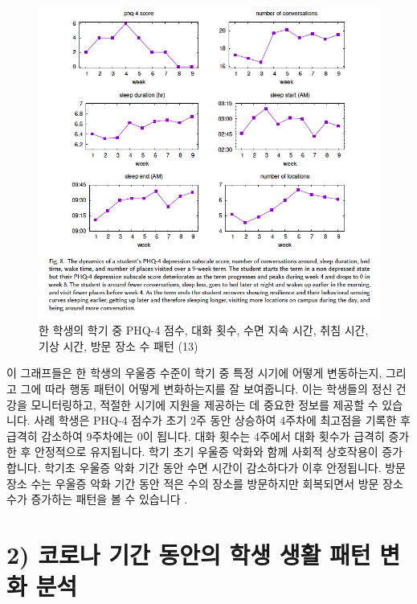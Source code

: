 \documentclass[
  letterpaper,
]{book}
\begin{document}
\begin{figure}[H]

{\centering \includegraphics{img/fig9.png}

}

\caption{한 학생의 학기 중 PHQ-4 점수, 대화 횟수, 수면 지속 시간, 취침
시간, 기상 시간, 방문 장소 수 패턴 (13)}

\end{figure}%

이 그래프들은 한 학생의 우울증 수준이 학기 중 특정 시기에 어떻게
변동하는지, 그리고 그에 따라 행동 패턴이 어떻게 변화하는지를 잘
보여줍니다. 이는 학생들의 정신 건강을 모니터링하고, 적절한 시기에 지원을
제공하는 데 중요한 정보를 제공할 수 있습니다. 사례 학생은 PHQ-4 점수가
초기 2주 동안 상승하여 4주차에 최고점을 기록한 후 급격히 감소하여
9주차에는 0이 됩니다. 대화 횟수는 4주에서 대화 횟수가 급격히 증가한 후
안정적으로 유지됩니다. 학기 초기 우울증 악화와 함께 사회적 상호작용이
증가합니다. 학기초 우울증 악화 기간 동안 수면 시간이 감소하다가 이후
안정됩니다. 방문 장소 수는 우울증 악화 기간 동안 적은 수의 장소를
방문하지만 회복되면서 방문 장소 수가 증가하는 패턴을 볼 수 있습니다 .

\section{2) 코로나 기간 동안의 학생 생활 패턴 변화
분석}\label{uxcf54uxb85cuxb098-uxae30uxac04-uxb3d9uxc548uxc758-uxd559uxc0dd-uxc0dduxd65c-uxd328uxd134-uxbcc0uxd654-uxbd84uxc11d}
\end{document}
